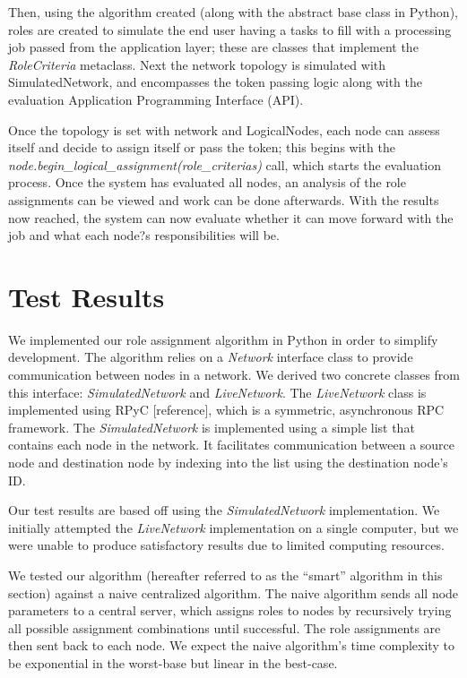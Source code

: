\documentclass[11pt]{article}
\begin{document}
\begin{multicols}{2}
Then, using the algorithm created (along with the abstract base class in Python), roles are created to simulate the end user having a tasks to fill with a processing job passed from the application layer; these are classes that implement the \textit{RoleCriteria} metaclass.  Next the network topology is simulated with SimulatedNetwork, and encompasses the token passing logic along with the evaluation Application Programming Interface (API).  

Once the topology is set with network and LogicalNodes, each node can assess itself and decide to assign itself or pass the token; this begins with the \textit{node.begin\_logical\_assignment(role\_criterias)} call, which starts the evaluation process.  Once the system has evaluated all nodes, an analysis of the role assignments can be viewed and work can be done afterwards.  With the results now reached, the system can now evaluate whether it can move forward with the job and what each node?s responsibilities will be.  

\section{Test Results}

We implemented our role assignment algorithm in Python in order to simplify development. The algorithm relies on a \textit{Network} interface class to provide communication between nodes in a network. We derived two concrete classes from this interface: \textit{SimulatedNetwork} and \textit{LiveNetwork}. The \textit{LiveNetwork} class is implemented using RPyC [reference], which is a symmetric, asynchronous RPC framework. The \textit{SimulatedNetwork} is implemented using a simple list that contains each node in the network. It facilitates communication between a source node and destination node by indexing into the list using the destination node's ID.

Our test results are based off using the \textit{SimulatedNetwork} implementation. We initially attempted the \textit{LiveNetwork} implementation on a single computer, but we were unable to produce satisfactory results due to limited computing resources. 

We tested our algorithm (hereafter referred to as the ``smart'' algorithm in this section) against a naive centralized algorithm. The naive algorithm sends all node parameters to a central server, which assigns roles to nodes by recursively trying all possible assignment combinations until successful. The role assignments are then sent back to each node. We expect the naive algorithm's time complexity to be exponential in the worst-base but linear in the best-case.


\end{multicols}
\end{document}
